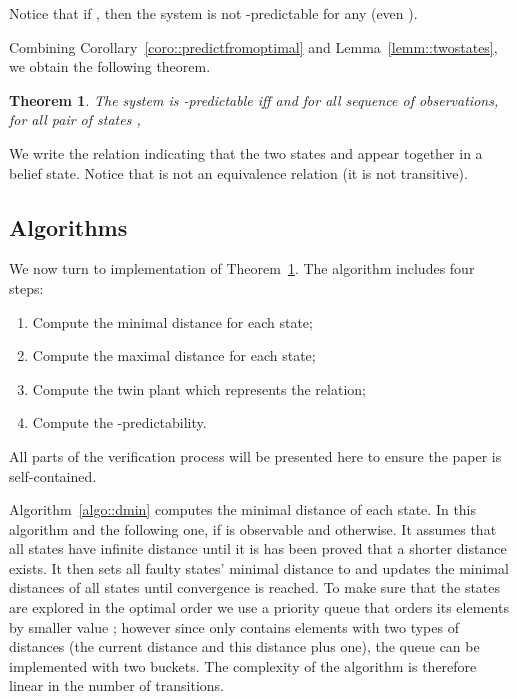 \documentclass{article}
\newtheorem{theo}[lemm]{Theorem}
\begin{document}
Notice that if , 
then the system is not -predictable for any  
(even ).  

Combining Corollary~\ref{coro::predictfromoptimal} 
and Lemma~\ref{lemm::twostates}, 
we obtain the following theorem.  

\begin{theo}\label{theo::computingpredictability}
  The system is -predictable 
  iff  and 
  for all sequence  of observations, 
  for all pair of states , 
  
\end{theo}

We write  the relation 
indicating that the two states  and  
appear together in a belief state.  
Notice that  is not an equivalence relation 
(it is not transitive).  

\subsection{Algorithms}


We now turn to implementation of Theorem~\ref{theo::computingpredictability}.  
The algorithm includes four steps: 
\begin{enumerate}
\item 
  Compute the minimal distance for each state; 
\item 
  Compute the maximal distance for each state; 
\item 
  Compute the twin plant which represents the  relation; 
\item 
  Compute the -predictability.  
\end{enumerate}
All parts of the verification process will be presented here 
to ensure the paper is self-contained.  

Algorithm~\ref{algo::dmin} computes the minimal distance of each state.  
In this algorithm and the following one, 
 if  is observable and  otherwise.  
It assumes that all states have infinite distance 
until it is has been proved that a shorter distance exists.  
It then sets all faulty states' minimal distance to  
and updates the minimal distances of all states 
until convergence is reached.  
To make sure that the states are explored in the optimal order 
we use a priority queue  
that orders its elements by smaller value ; 
however since  only contains elements 
with two types of distances 
(the current distance and this distance plus one), 
the queue can be implemented with two buckets.  
The complexity of the algorithm is therefore linear 
in the number  of transitions.  
\end{document}

